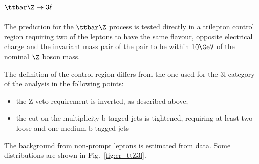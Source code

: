 \clearpage


\subsection{\texorpdfstring{$\ttbar\Z\to3\ell$}{ttZ->3l}}
\label{sec:ttZto3l}
The prediction for the $\ttbar\Z$ process is tested directly in a trilepton control region
requiring two of the leptons to have the same flavour, opposite electrical charge and the
invariant mass pair of the pair to be within $10\GeV$ of the nominal $\Z$ boson mass.

The definition of the control region differs from the one used for the 3l category of the analysis in the following points:
\begin{itemize}
\item the Z veto requirement is inverted, as described above;
\item the cut on the multiplicity b-tagged jets is tightened, requiring at least two loose and one medium b-tagged jets
\end{itemize}
The background from non-prompt leptons is estimated from data.
Some distributions are shown in Fig.~\ref{fig:cr_ttZ3l}.

